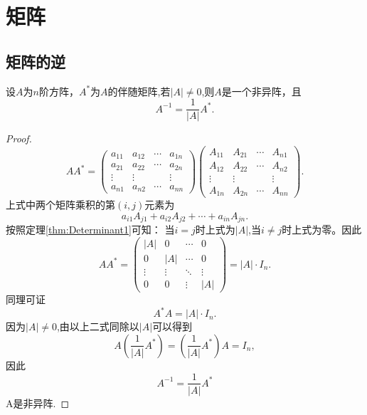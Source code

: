 \section{矩阵}

\subsection{矩阵的逆}
\begin{theorem}\label{thm:Matrix1}
设$A$为$n$阶方阵，$A^*$为$A$的伴随矩阵,若$|A| \neq 0$,则$A$是一个非异阵，且
  \begin{equation}\label{eq:Matrix1}
  A^{-1}=\frac{1}{|A|}A^*.
\end{equation}

\end{theorem}

\begin{proof}
  \begin{equation*}
    AA^*=
    \begin{pmatrix}
      a_{11} & a_{12} & \cdots & a_{1n}\\
      a_{21} & a_{22} & \cdots & a_{2n}\\
      \vdots & \vdots & & \vdots\\
      a_{n1} & a_{n2} & \cdots & a_{nn}
    \end{pmatrix}
    \begin{pmatrix}
      A_{11} & A_{21} & \cdots & A_{n1}\\
      A_{12} & A_{22} & \cdots & A_{n2}\\
      \vdots & \vdots & & \vdots\\
      A_{1n} & A_{2n} & \cdots & A_{nn}
    \end{pmatrix}.
    \end{equation*}
    上式中两个矩阵乘积的第$(i,j)$元素为
    \begin{equation*}
      a_{i1}A_{j1}+a_{i2}A_{j2}+\cdots+a_{in}A_{jn}.
    \end{equation*}
    按照定理\eqref{thm:Determinant1}可知：
    当$i=j$时上式为$|A|$,当$i \neq j$时上式为零。因此
    \begin{equation*}
      AA^*=
      \begin{pmatrix}
        |A| & 0 & \cdots & 0\\
        0 & |A| & \cdots & 0\\
        \vdots & \vdots & \ddots & \vdots\\
        0 & 0 & \vdots & |A|
      \end{pmatrix}=|A|\cdot I_n.
    \end{equation*}
同理可证
\begin{equation*}
  A^*A=|A|\cdot I_n.
\end{equation*}
因为$|A|\neq 0$,由以上二式同除以$|A|$可以得到
\begin{equation*}
  A(\frac{1}{|A|}A^*)=(\frac{1}{|A|}A^*)A=I_n,
\end{equation*}
因此
\begin{equation*}
  A^{-1}=\frac{1}{|A|}A^*
\end{equation*}
A是非异阵.
\end{proof}

